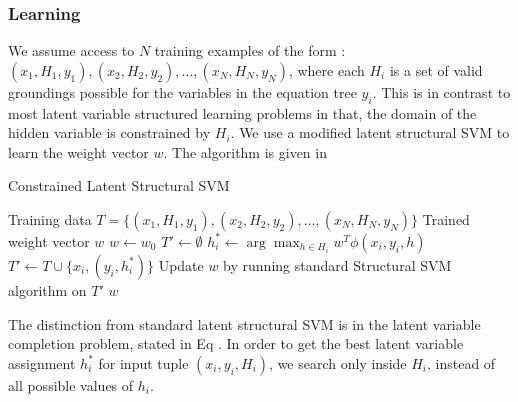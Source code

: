     \subsubsection{Learning}
      We assume access to $N$ training examples of the form : $(x_1,
      H_1, y_1), (x_2, H_2, y_2), \ldots, (x_N, H_N, y_N)$, where each
      $H_i$ is a set of valid groundings possible for the variables in
      the equation tree $y_i$. This is in contrast to most latent
      variable structured learning problems in that, the domain of the
      hidden variable is constrained by $H_i$. We use a modified
      latent structural SVM to learn the weight vector $w$. The algorithm 
      is given in 

      \begin{algorithm}
       \caption{Constrained Latent Structural SVM}
       \label{lssvm}
       \begin{algorithmic}[1]
         \REQUIRE Training data $T = \{(x_1, H_1, y_1), (x_2, H_2, y_2),
         \ldots, (x_N, H_N, y_N)\}$ 
         \ENSURE Trained weight vector $w$
         \STATE $w \leftarrow w_0$
         \REPEAT 
           \STATE $T' \leftarrow \emptyset$
             \STATE $h_i^* \leftarrow \arg\max_{h \in H_i} w^T\phi(x_i, y_i, h)$
             \STATE $T' \leftarrow T \cup \{x_i, (y_i, h_i^*)\}$  
           \ENDFOR
           \STATE Update $w$ by running standard Structural SVM algorithm
           on $T'$
         \RETURN $w$
       \end{algorithmic}
      \end{algorithm}


      

      The distinction from standard latent structural SVM is in the latent
      variable completion problem, stated in Eq . In order to get the best 
      latent variable assignment $h_i^*$ for input tuple $(x_i, y_i, H_i)$, 
      we search only inside $H_i$, instead of all possible values of $h_i$. 

